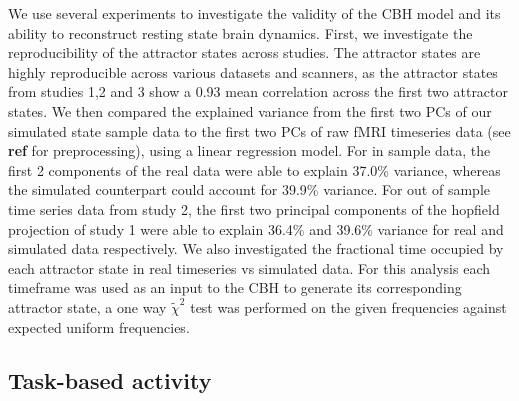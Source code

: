 \documentclass{article}
\begin{document}
We use several experiments to investigate the validity of the CBH model and its ability to reconstruct resting state
brain dynamics. First, we investigate the reproducibility  of the attractor states across studies.
The attractor states are highly reproducible across various datasets and scanners, as the attractor states from studies
1,2 and 3 show a 0.93 mean correlation across the first two attractor states.
We then compared the explained variance from the first two PCs of our simulated state sample data to the first two PCs of
raw fMRI timeseries data (see \textbf{ref} for preprocessing), using a linear regression model.
For in sample data, the first 2 components of the real data
were able to explain 37.0\% variance, whereas the simulated counterpart could account for 39.9\% variance. For out of
sample time series data from study 2, the first two principal components of the hopfield projection of study 1 were
able to explain 36.4\% and 39.6\% variance for real and simulated data respectively.
We also investigated the fractional time occupied by each attractor state in real timeseries vs simulated data. For
this analysis each timeframe was used as an input to the CBH to generate its corresponding attractor state, a one
way $\tilde{\chi}^2$ test was performed on the given frequencies against expected uniform frequencies.

\subsection{Task-based activity}\label{Task-based activity}
\end{document}

